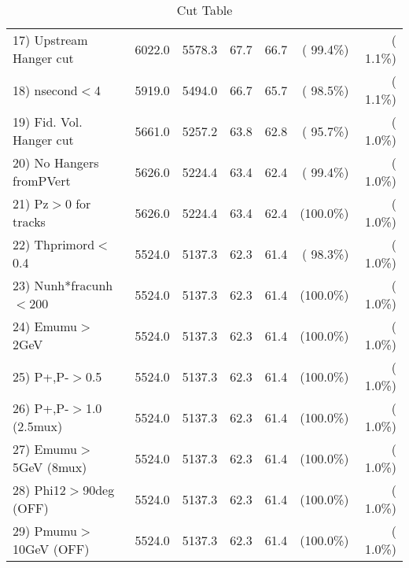 \begin{table}[h!]
\begin{tabular}{||l||r|r|r|r|r|r||}
 17) Upstream Hanger cut  &       6022.0 &       5578.3 &         67.7 &         66.7 & ( 99.4\%) & (  1.1\%) \\
 18) nsecond$<$4          &       5919.0 &       5494.0 &         66.7 &         65.7 & ( 98.5\%) & (  1.1\%) \\
 19) Fid. Vol. Hanger cut &       5661.0 &       5257.2 &         63.8 &         62.8 & ( 95.7\%) & (  1.0\%) \\
 20) No Hangers fromPVert &       5626.0 &       5224.4 &         63.4 &         62.4 & ( 99.4\%) & (  1.0\%) \\
 21) Pz$>$0 for tracks    &       5626.0 &       5224.4 &         63.4 &         62.4 & (100.0\%) & (  1.0\%) \\
 22) Thprimord$<$0.4      &       5524.0 &       5137.3 &         62.3 &         61.4 & ( 98.3\%) & (  1.0\%) \\
 23) Nunh*fracunh$<$200   &       5524.0 &       5137.3 &         62.3 &         61.4 & (100.0\%) & (  1.0\%) \\
 24) Emumu$>$2GeV         &       5524.0 &       5137.3 &         62.3 &         61.4 & (100.0\%) & (  1.0\%) \\
 25) P+,P-$>$0.5          &       5524.0 &       5137.3 &         62.3 &         61.4 & (100.0\%) & (  1.0\%) \\
 26) P+,P-$>$1.0 (2.5mux) &       5524.0 &       5137.3 &         62.3 &         61.4 & (100.0\%) & (  1.0\%) \\
 27) Emumu$>$5GeV  (8mux) &       5524.0 &       5137.3 &         62.3 &         61.4 & (100.0\%) & (  1.0\%) \\
 28) Phi12$>$90deg  (OFF) &       5524.0 &       5137.3 &         62.3 &         61.4 & (100.0\%) & (  1.0\%) \\
 29) Pmumu$>$10GeV  (OFF) &       5524.0 &       5137.3 &         62.3 &         61.4 & (100.0\%) & (  1.0\%) \\
 \hline
 \hline
 \end{tabular}
 \caption{Cut Table           }
 \label{tab-cutcohjpsi-mumu_cohpip}
 \end{table}
